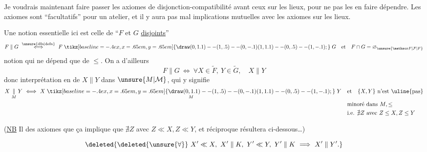 Je voudrais maintenant faire passer les axiomes de disjonction-compatibilité avant ceux sur les lieux, pour ne pas  les en faire dépendre. Les axiomes sont ``facultatifs'' pour un atelier, et il y aura pas mal  implications mutuelles avec les axiomes sur les lieux.

Une notion essentielle ici est celle de ``$F$ et $G$ \uline{disjoints}''
\[
 F\parallel G\ \overset{\unsure{\mathrm{dfn}|\mathrm{defn}}}{\Longleftrightarrow}\ F\mathrel{\tikz[baseline=-.4ex,x=.65em,y=.65em]{\draw (0,1.1)--(1,.5)--(0,-.1) (1,1.1)--(0,.5)--(1,-.1);}}G\quad\text{et}\quad F\cap G=\varnothing_{\unsure{\mathscr F|\mathcal F|F}}
\]
notion qui ne dépend que de $\leq$. On a d'ailleurs
\[
 F\parallel G\ \Longleftrightarrow\ \forall X\in\widetilde F,\ Y\in\widetilde G,\quad X\parallel Y
\]
donc interprétation en  de $X\parallel Y$ dans $\unsure{M|\mathcal M}$, qui y signifie
\[
\begin{aligned}
X\mathrel{\underset{M}{\parallel}}Y\ \Longleftrightarrow\
 X\mathrel{\underset{M}{\mathrel{\tikz[baseline=-.4ex,x=.65em,y=.65em]{\draw (0,1.1)--(1,.5)--(0,-.1) (1,1.1)--(0,.5)--(1,-.1);}}}}Y\quad &\text{et}\quad\{X,Y\}\ \text{n'est \uline{pas}}\\
&\text{minoré dans } M,\leq\\
&\text{i.e. }\nexists Z\ \text{avec }Z\leq X,Z\leq Y
\end{aligned}
\]

(\uline{NB} Il  des axiomes  que ça implique que $\nexists Z$ avec $Z\ll X,Z\ll Y$,  et  réciproque résultera  ci-dessous\ldots)

%
\[
\deleted{\deleted{\unsure{\forall}}\ X'\ll X,\ X'\parallel K,\ Y'\ll Y,\ Y'\parallel K\ \Longrightarrow\ X'\parallel Y'.}
\]

